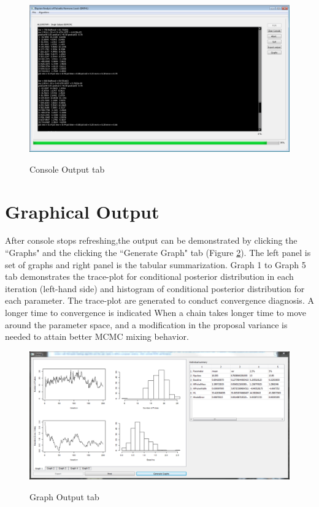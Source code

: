 \documentclass[11pt]{book}
\begin{document}
\begin{figure}
  \centering
  \includegraphics[width=\textwidth]{consoleoutput.PNG}\\
  \caption{Console Output tab}\label{console}
\end{figure}

\newpage
\section{Graphical Output} \label{o2}
After console stops refreshing,the output can be demonstrated by clicking the ``Graphs"  and the clicking the ``Generate Graph" tab  (Figure \ref{graph}). The left panel is set of graphs and right panel is the tabular summarization. Graph 1 to Graph 5 tab demonstrates the trace-plot for conditional posterior distribution in each iteration (left-hand side) and histogram of conditional posterior distribution for each parameter. The trace-plot are generated to conduct convergence diagnosis. A longer time to convergence is indicated When a chain takes longer time to move around the parameter space, and a modification in the proposal variance is needed to attain better MCMC mixing behavior.

\begin{figure}
  \centering
  \includegraphics[width=\textwidth]{grapho.PNG}\\
  \caption{Graph Output tab}\label{graph}
\end{figure}
\end{document}
